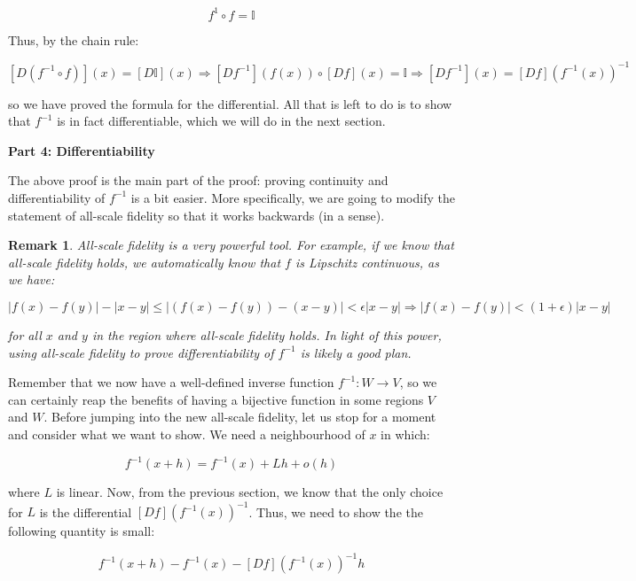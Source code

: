 \documentclass[10pt, oneside]{amsart}
\newtheorem{rem}{Remark}
\begin{document}
    $$f^{1} \circ f = \mathbb{I}$$

    Thus, by the chain rule:

    $$[D (f^{-1} \circ f)](x) = [D \mathbb{I}](x) \Rightarrow [D f^{-1}](f(x)) \circ [Df](x) = \mathbb{I} \Rightarrow [D f^{-1}](x) = [Df](f^{-1}(x))^{-1}$$

    so we have proved the formula for the differential. All that is left to do is to show that $f^{-1}$ is in fact differentiable, which we will do in the next section.
    \newline

    \textbf{Part 4: Differentiability}
    \newline

    The above proof is the main part of the proof: proving continuity and differentiability of $f^{-1}$ is a bit easier. More specifically, we are going to modify the statement of all-scale fidelity so
    that it works backwards (in a sense).
    \newline

    \begin{rem}
      All-scale fidelity is a very powerful tool. For example, if we know that all-scale fidelity holds, we automatically know that $f$ is Lipschitz continuous, as we have:

      $$|f(x) - f(y)| - |x - y| \leq | (f(x) - f(y)) - (x - y)| < \epsilon |x - y| \Rightarrow |f(x) - f(y)| < (1 + \epsilon) |x - y|$$

      for all $x$ and $y$ in the region where all-scale fidelity holds. In light of this power, using all-scale fidelity to prove differentiability of $f^{-1}$ is likely a good plan.
    \end{rem}

    Remember that we now have a well-defined inverse function $f^{-1} : W \rightarrow V$, so we can certainly reap the benefits of having a bijective function in some regions $V$ and $W$.
    Before jumping into the new all-scale fidelity, let us stop for a moment and consider what we want to show. We need a neighbourhood of $x$ in which:

    $$f^{-1}(x + h) = f^{-1}(x) + L h + o(h)$$

    where $L$ is linear. Now, from the previous section, we know that the only choice for $L$ is the differential $[Df](f^{-1}(x))^{-1}$. Thus, we need to show the the following quantity
    is small:

    $$f^{-1}(x + h) - f^{-1}(x) - [Df](f^{-1}(x))^{-1} h$$
\end{document}

